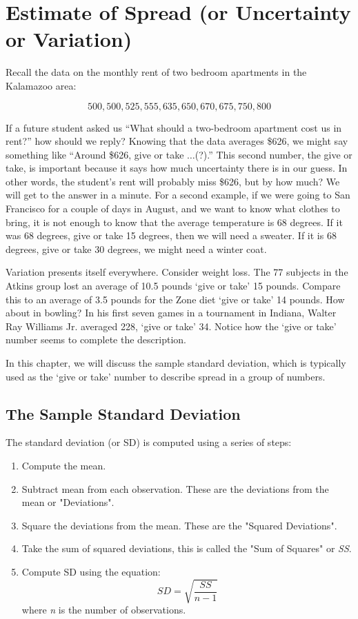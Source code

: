 \documentclass[11pt]{book}\usepackage[]{graphicx}\usepackage[]{color}
\begin{document}
\section{Estimate of Spread (or Uncertainty or Variation)}

Recall the data on the monthly rent of two bedroom apartments in the Kalamazoo area:

$$ 500, 500, 525, 555, 635, 650, 670, 675, 750, 800 $$

If a future student asked us ``What should a two-bedroom apartment cost us in rent?'' how should we reply? Knowing that the data averages \$626, we might say something like ``Around \$626, give or take $\dots$(?).''   This second number, the give or take, is important because it says how much uncertainty there is in our guess.  In other words, the student's rent will probably miss \$626, but by how much?   We will get to the answer in a minute.   
For a second example, if we were going to San Francisco for a couple of days in August, and we want to know what clothes to bring, it is not enough to know that the average temperature is 68 degrees.  If it was 68 degrees, give or take 15 degrees, then we will need a sweater.  If it is 68 degrees, give or take 30 degrees, we might need a winter coat.

Variation presents itself everywhere.  Consider weight loss.  The 77 subjects in the Atkins group lost an average of 10.5 pounds `give or take' 15 pounds.  Compare this to an average of 3.5 pounds for the Zone diet `give or take' 14 pounds. How about in bowling?  In his first seven games in a tournament in Indiana, Walter Ray Williams Jr. averaged 228, `give or take' 34.   Notice how the `give or take' number seems to complete the description.

In this chapter, we will discuss the sample standard deviation, which is typically used as the ‘give or take’ number to describe spread in a group of numbers.

\subsection{The Sample Standard Deviation}

The standard deviation (or SD) is computed using a series of steps:
\begin{enumerate}
\item Compute the mean.
\item Subtract mean from each observation. These are the deviations from the mean or "Deviations".
\item Square the deviations from the mean. These are the "Squared Deviations".
\item Take the sum of squared deviations, this is called the "Sum of Squares" or \textit{SS}.
\item Compute SD using the equation: $$SD=\sqrt{\frac{SS}{n-1}}$$ where \textit{n} is the number of observations.
\end{enumerate}
\end{document}
